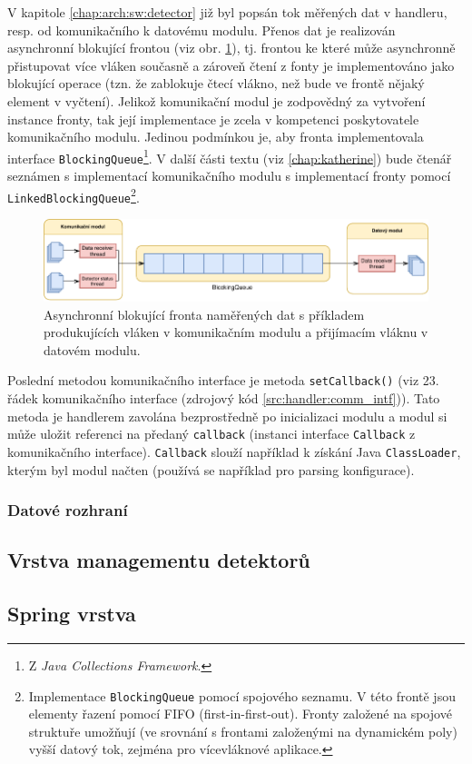 V kapitole \ref{chap:arch:sw:detector} již byl popsán tok měřených dat v handleru, resp. od komunikačního k datovému modulu. Přenos dat je realizován asynchronní blokující frontou (viz obr. \ref{fig:handler:data_queue}), tj. frontou ke které může asynchronně přistupovat více vláken současně a zároveň čtení z fonty je implementováno jako blokující operace (tzn. že zablokuje čtecí vlákno, než bude ve frontě nějaký element v vyčtení). Jelikož komunikační modul je zodpovědný za vytvoření instance fronty, tak její implementace je zcela v kompetenci poskytovatele komunikačního modulu. Jedinou podmínkou je, aby fronta implementovala interface \texttt{BlockingQueue}\footnote{Z \textit{Java Collections Framework}.}. V další části textu (viz \ref{chap:katherine}) bude čtenář seznámen s implementací komunikačního modulu s implementací fronty pomocí \texttt{LinkedBlockingQueue}\footnote{Implementace \texttt{BlockingQueue} pomocí spojového seznamu. V této frontě jsou elementy řazení pomocí FIFO (first-in-first-out). Fronty založené na spojové struktuře umožňují (ve srovnání s frontami založenými na dynamickém poly) vyšší datový tok, zejména pro vícevláknové aplikace.}.
\begin{figure}[h]
	\begin{center}
		\vspace*{0.5cm}
		\includegraphics[width=14.5cm]{figures/handler_data_queue.pdf}
		\caption{Asynchronní blokující fronta naměřených dat s příkladem produkujících vláken v komunikačním modulu a přijímacím vláknu v datovém modulu.}
		\label{fig:handler:data_queue}
	\end{center}
\end{figure}

Poslední metodou komunikačního interface je metoda \texttt{setCallback()} (viz 23. řádek komunikačního interface (zdrojový kód \ref{src:handler:comm_intf})). Tato metoda je handlerem zavolána bezprostředně po inicializaci modulu a modul si může uložit referenci na předaný \texttt{callback} (instanci interface \texttt{Callback} z komunikačního interface). \texttt{Callback} slouží například k získání Java \texttt{ClassLoader}, kterým byl modul načten (používá se například pro parsing konfigurace).

\subsubsection{Datové rozhraní}


\subsection{Vrstva managementu detektorů}\label{chap:handler:detectors_layer}


\subsection{Spring vrstva}\label{chap:handler:spring}
